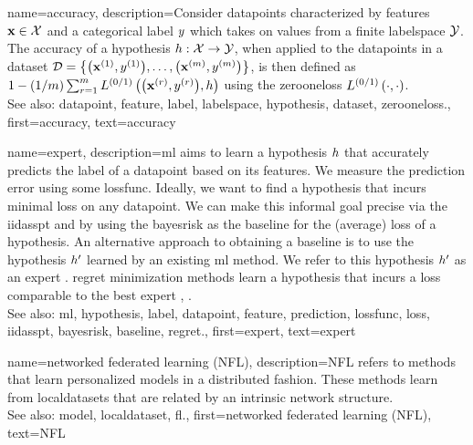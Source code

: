 {name={accuracy},
	description={Consider \glspl{datapoint} characterized by \glspl{feature} ${\bf x} \in \mathcal{X}$ and 
		a categorical \gls{label} $y$ which takes on values from a finite \gls{labelspace} $\mathcal{Y}$. The 
		accuracy of a \gls{hypothesis} $h: \mathcal{X} \rightarrow \mathcal{Y}$, when applied 
		to the \glspl{datapoint} in a \gls{dataset} $\mathcal{D} = \big\{ \big({\bf x}^{(1)}, y^{(1)} \big), \ldots, \big({\bf x}^{(m)},y^{(m)}\big) \big\}$, 
		is then defined as $1 - (1/m)\sum_{r=1}^{m} L^{(0/1)}\left(\big({\bf x}^{(r)},y^{(r)}\big),h \right)$ using the \gls{zerooneloss} $L^{(0/1)}\left(\cdot,\cdot \right)$.
					\\ 
		See also: \gls{datapoint}, \gls{feature}, \gls{label}, \gls{labelspace}, \gls{hypothesis}, \gls{dataset}, \gls{zerooneloss}.},
	first={accuracy},
	text={accuracy} 
}





{name={expert},
	description={\gls{ml} aims to learn a \gls{hypothesis} $h$ that accurately predicts the \gls{label} 
		of a \gls{datapoint} based on its \glspl{feature}. We measure the \gls{prediction} error using 
		some \gls{lossfunc}. Ideally, we want to find a \gls{hypothesis} that incurs minimal \gls{loss} 
		on any \gls{datapoint}. We can make this informal goal precise via the \gls{iidasspt} 
		and by using the \gls{bayesrisk} as the \gls{baseline} for the (average) \gls{loss} of a \gls{hypothesis}. 
		An alternative approach to obtaining a \gls{baseline} is to use the \gls{hypothesis} $h'$ learned 
		by an existing \gls{ml} method. We refer to this \gls{hypothesis} $h'$ as an expert \cite{PredictionLearningGames}. \Gls{regret} minimization methods learn a \gls{hypothesis}
		that incurs a \gls{loss} comparable to the best expert \cite{PredictionLearningGames}, \cite{HazanOCO}.
					\\ 
		See also: \gls{ml}, \gls{hypothesis}, \gls{label}, \gls{datapoint}, \gls{feature}, \gls{prediction}, \gls{lossfunc}, \gls{loss}, \gls{iidasspt}, \gls{bayesrisk}, \gls{baseline}, \gls{regret}.},
	first={expert},
	text={expert} 
}

{name={networked federated learning (NFL)},
	description={NFL refers 
		to methods that learn personalized \glspl{model} in a distributed fashion. These methods learn from \glspl{localdataset} 
		that are related by an intrinsic network structure.
					\\ 
		See also: \gls{model}, \gls{localdataset}, \gls{fl}.},
	first={networked federated learning (NFL)},
	text={NFL} 
}


